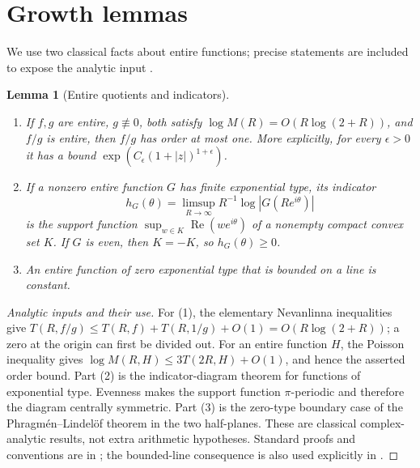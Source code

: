 \documentclass[11pt]{article}
\newtheorem{lemma}[theorem]{Lemma}
\theoremstyle{remark}\newtheorem{remark}[theorem]{Remark}
\newcommand{\Rea}{\operatorname{Re}}\newcommand{\Ima}{\operatorname{Im}}
\begin{document}
\section{Growth lemmas}

We use two classical facts about entire functions; precise statements are included to expose the analytic input \cite{Levin,Boas}.

\begin{lemma}[Entire quotients and indicators]\label{lem:entire}
\begin{enumerate}
\item If $f,g$ are entire, $g\not\equiv0$, both satisfy $\log M(R)=O(R\log(2+R))$, and $f/g$ is entire, then $f/g$ has order at most one. More explicitly, for every $\epsilon>0$ it has a bound $\exp(C_\epsilon(1+|z|)^{1+\epsilon})$.
\item If a nonzero entire function $G$ has finite exponential type, its indicator
\[
 h_G(\theta)=\limsup_{R\to\infty}R^{-1}\log|G(Re^{i\theta})|
\]
is the support function $\sup_{w\in K}\Rea(we^{i\theta})$ of a nonempty compact convex set $K$. If $G$ is even, then $K=-K$, so $h_G(\theta)\ge0$.
\item An entire function of zero exponential type that is bounded on a line is constant.
\end{enumerate}
\end{lemma}
\begin{proof}[Analytic inputs and their use]
For (1), the elementary Nevanlinna inequalities give
$T(R,f/g)\le T(R,f)+T(R,1/g)+O(1)=O(R\log(2+R))$; a zero at the origin can first be divided out. For an entire function $H$, the Poisson inequality gives $\log M(R,H)\le3T(2R,H)+O(1)$, and hence the asserted order bound. Part (2) is the indicator-diagram theorem for functions of exponential type. Evenness makes the support function $\pi$-periodic and therefore the diagram centrally symmetric. Part (3) is the zero-type boundary case of the Phragm\'en--Lindel\"of theorem in the two half-planes. These are classical complex-analytic results, not extra arithmetic hypotheses. Standard proofs and conventions are in \cite{Levin,Boas}; the bounded-line consequence is also used explicitly in \cite{Dyakonov}.
\end{proof}
\end{document}
